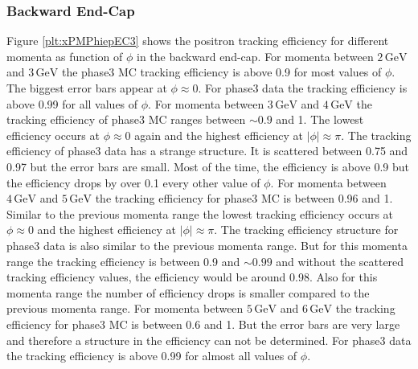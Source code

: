 \documentclass[a4paper,11pt,twosided,final,german,openbib,pdftex,listof=totoc,bibliography=totoc]{scrbook}
\begin{document}
\newpage

\subsubsection{Backward End-Cap}

Figure \ref{plt:xPMPhiepEC3} shows the positron tracking efficiency for different momenta as function of $\phi$ in the backward end-cap.
For momenta between $2\,\textrm{GeV}$ and $3\,\textrm{GeV}$ the phase3 MC tracking efficiency is above 0.9 for most values of $\phi$. The biggest error bars appear at $\phi \approx 0$. For phase3 data the tracking efficiency is above 0.99 for all values of $\phi$.
For momenta between $3\,\textrm{GeV}$ and $4\,\textrm{GeV}$ the tracking efficiency of phase3 MC ranges between $\sim 0.9$ and 1. The lowest efficiency occurs at $\phi \approx 0$ again and the highest efficiency at $|\phi| \approx \pi$. The tracking efficiency of phase3 data has a strange structure. It is scattered between 0.75 and 0.97 but the error bars are small. Most of the time, the efficiency is above 0.9 but the efficiency drops by over 0.1 every other value of $\phi$.
For momenta between $4\,\textrm{GeV}$ and $5\,\textrm{GeV}$ the tracking efficiency for phase3 MC is between 0.96 and 1. Similar to the previous momenta range the lowest tracking efficiency occurs at  $\phi \approx 0$ and the highest efficiency at $|\phi| \approx \pi$. The tracking efficiency structure for phase3 data is also similar to the previous momenta range. But for this momenta range the tracking efficiency is between 0.9 and $\sim 0.99$ and without the scattered tracking efficiency values, the efficiency would be around 0.98. Also for this momenta range the number of efficiency drops is smaller compared to the previous momenta range.
For momenta between $5\,\textrm{GeV}$ and $6\,\textrm{GeV}$ the tracking efficiency for phase3 MC is between 0.6 and 1. But the error bars are very large and therefore a structure in the efficiency can not be determined. For phase3 data the tracking efficiency is above 0.99 for almost all values of $\phi$.
\end{document}
